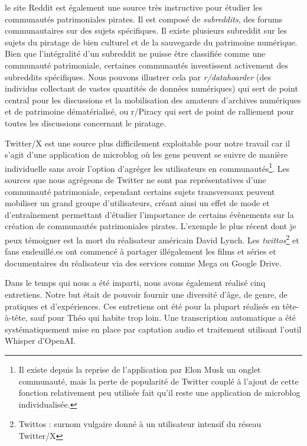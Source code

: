 \begin{itemize}
    \subitem le site Reddit est également une source très instructive pour étudier les communautés patrimoniales pirates. Il est composé de \textit{subreddits}, des forums communautaires sur des sujets spécifiques. Il existe plusieurs subreddit sur les sujets du piratage de bien culturel et de la sauvegarde du patrimoine numérique. Bien que l'intégralité d'un subreddit ne puisse être classifiée comme une communauté patrimoniale, certaines communautés investissent activement des subreddits spécifiques. Nous pouvons illustrer cela par \textit{r/datahoarder} (des individus collectant de vastes quantités de données numériques) qui sert de point central pour les discussions et la mobilisation des amateurs d'archives numériques et de patrimoine dématérialisé, ou r/Piracy qui sert de point de ralliement pour toutes les discussions concernant le piratage.

    \subitem Twitter/X est une source plus difficilement exploitable pour notre travail car il s'agit d'une application de microblog où les gens peuvent se suivre de manière individuelle sans avoir l'option d’agréger les utilisateurs en communautés\footnote{Il existe depuis la reprise de l'application par Elon Musk un onglet communauté, mais la perte de popularité de Twitter couplé à l'ajout de cette fonction relativement peu utilisée fait qu'il reste une application de microblog individualisée. }. Les sources que nous agrégeons de Twitter ne sont pas représentatives d'une communauté patrimoniale, cependant certains sujets transversaux peuvent mobiliser un grand groupe d'utilisateurs, créant ainsi un effet de mode et d’entraînement permettant d'étudier l'importance de certains évènements sur la création de communautés patrimoniales pirates. L'exemple le plus récent dont je peux témoigner est la mort du réalisateur américain David Lynch. Les \textit{twittos}\footnote{Twittos : surnom vulgaire donné à un utilisateur intensif du réseau Twitter/X} et fans endeuillé.es ont commencé à partager illégalement les films et séries et documentaires du réalisateur via des services comme Mega ou Google Drive. 
    
    \end{itemize}

Dans le temps qui nous a été imparti, nous avons également réalisé cinq entretiens. Notre but était de pouvoir fournir une diversité d'âge, de genre, de pratiques et d'expériences. Ces entretiens ont été pour la plupart réalisés en tête-à-tête, sauf pour Théo qui habite trop loin. Une transcription automatique a été systématiquement mise en place par captation audio et traitement utilisant l'outil Whisper d'OpenAI.\newline

